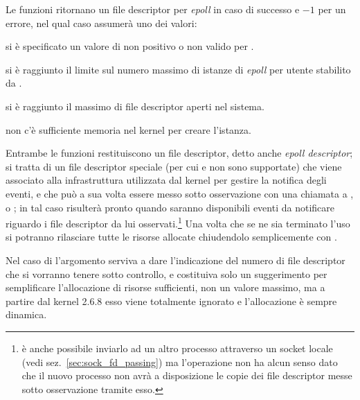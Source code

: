 \begin{funcproto}{

}
{Le funzioni ritornano un file descriptor per \textit{epoll} in caso di
  successo e $-1$ per un errore, nel qual caso  assumerà uno dei
  valori:
  \begin{errlist}
  \item[\errcode{EINVAL}] si è specificato un valore di  non
    positivo o non valido per .
  \item[\errcode{EMFILE}] si è raggiunto il limite sul numero massimo di
    istanze di \textit{epoll} per utente stabilito da
    .
  \item[\errcode{ENFILE}] si è raggiunto il massimo di file descriptor aperti
    nel sistema.
  \item[\errcode{ENOMEM}] non c'è sufficiente memoria nel kernel per creare
    l'istanza.
  \end{errlist}
}  
\end{funcproto}

Entrambe le funzioni restituiscono un file descriptor, detto anche
\textit{epoll descriptor}; si tratta di un file descriptor speciale (per cui
 e  non sono supportate) che viene associato alla
infrastruttura utilizzata dal kernel per gestire la notifica degli eventi, e
che può a sua volta essere messo sotto osservazione con una chiamata a
,  o ; in tal caso risulterà pronto
quando saranno disponibili eventi da notificare riguardo i file descriptor da
lui osservati.\footnote{è anche possibile inviarlo ad un altro processo
  attraverso un socket locale (vedi sez.~\ref{sec:sock_fd_passing}) ma
  l'operazione non ha alcun senso dato che il nuovo processo non avrà a
  disposizione le copie dei file descriptor messe sotto osservazione tramite
  esso.} Una volta che se ne sia terminato l'uso si potranno rilasciare tutte
le risorse allocate chiudendolo semplicemente con .

Nel caso di  l'argomento  serviva a dare
l'indicazione del numero di file descriptor che si vorranno tenere sotto
controllo, e costituiva solo un suggerimento per semplificare l'allocazione di
risorse sufficienti, non un valore massimo, ma a partire dal kernel 2.6.8 esso
viene totalmente ignorato e l'allocazione è sempre dinamica.

